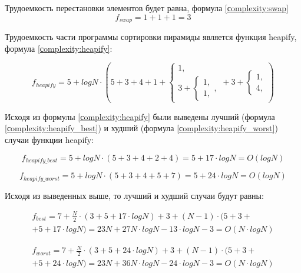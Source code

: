 Трудоемкость перестановки элементов будет равна, формула \ref{сomplexity:swap}
\begin{equation}
	\label{сomplexity:swap}
	f_{swap} = 1 + 1 + 1 = 3
\end{equation}

Трудоемкость части программы сортировки пирамиды является функция heapify, формула \ref{сomplexity:heapify}:

\begin{equation}
	\label{сomplexity:heapify}
	f_{heapify} = 5 + log N \cdot (5 + 3 + 4 + 1 + 
	\begin{cases}
		1, \\
		3 + \begin{cases}
			1, \\
			1,
		\end{cases},
	\end{cases} + 3 +
	\begin{cases}
		1, \\
		4,
	\end{cases})
\end{equation}
 
Исходя из формулы \ref{сomplexity:heapify} были выведены лучший (формула \ref{сomplexity:heapify_best}) и худший (формула \ref{сomplexity:heapify_worst}) случаи функции heapify:

\begin{equation}
	\label{сomplexity:heapify_best}
	f_{heapify\_best} = 5 + log N \cdot (5 + 3 + 4 + 2 + 4) = 5 + 17 \cdot log N = O(log N) 
\end{equation}

\begin{equation}
	\label{сomplexity:heapify_worst}
	f_{heapify\_worst} = 5 + log N \cdot (5 + 3 + 4 + 5 + 7) = 5 + 24 \cdot log N = O(log N) 
\end{equation}

Исходя из выведенных выше, то лучший и худший случаи будут равны: 

\begin{equation}
	\label{сomplexity:heap_best_p}
	\begin{aligned}
		f_{best} = 7 + \frac{N}{2} \cdot (3 + 5 + 17 \cdot log N) + 3 + (N - 1) \cdot (5 + 3 + \\ 
		+ 5 + 17 \cdot log N) = 23N + 27N \cdot log N - 13 \cdot log N - 3 = O(N \cdot log N)
	\end{aligned}
\end{equation}

\begin{equation}
	\label{сomplexity:heap_worst_p}
	\begin{aligned}
		f_{worst} = 7 + \frac{N}{2} \cdot (3 + 5 + 24 \cdot log N) + 3 + (N - 1) \cdot (5 + 3 + \\ 
		+ 5 + 24 \cdot log N) = 23N + 36N \cdot log N - 24 \cdot log N - 3 = O(N \cdot log N)
	\end{aligned}
\end{equation}

